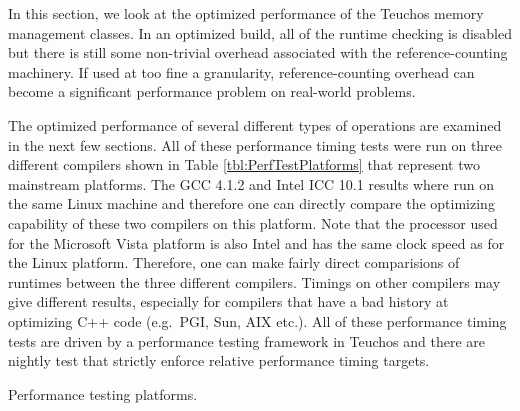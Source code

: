 \documentclass[pdf,ps2pdf,11pt]{SANDreport}
\begin{document}
In this section, we look at the optimized performance of the Teuchos
memory management classes.  In an optimized build, all of the runtime
checking is disabled but there is still some non-trivial overhead
associated with the reference-counting machinery.  If used at too fine
a granularity, reference-counting overhead can become a significant
performance problem on real-world problems.

The optimized performance of several different types of operations are
examined in the next few sections.  All of these performance timing
tests were run on three different compilers shown in Table
{}\ref{tbl:PerfTestPlatforms} that represent two mainstream platforms.
The GCC 4.1.2 and Intel ICC 10.1 results where run on the same Linux
machine and therefore one can directly compare the optimizing
capability of these two compilers on this platform.  Note that the
processor used for the Microsoft Vista platform is also Intel and has
the same clock speed as for the Linux platform.  Therefore, one can
make fairly direct comparisions of runtimes between the three
different compilers.  Timings on other compilers may give different
results, especially for compilers that have a bad history at
optimizing C++ code (e.g.\ PGI, Sun, AIX etc.).  All of these
performance timing tests are driven by a performance testing framework
in Teuchos and there are nightly test that strictly enforce relative
performance timing targets.

\begin{table}
\caption{\label{tbl:PerfTestPlatforms}
Performance testing platforms.}
\end{table}
\end{document}

